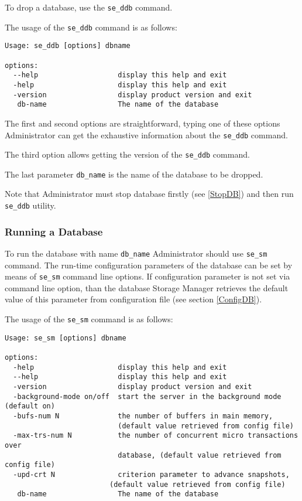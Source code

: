 \documentclass[a4paper,12pt]{article}
\begin{document}
To drop a database, use the \verb!se_ddb! command.

The usage of the \verb!se_ddb! command is as follows:

\begin{verbatim}
Usage: se_ddb [options] dbname

options:
  --help                   display this help and exit
  -help                    display this help and exit
  -version                 display product version and exit
   db-name                 The name of the database
\end{verbatim}

The first and second options are straightforward, typing one of these options Administrator can get the exhaustive information about the \verb!se_ddb! command.

The third option allows getting the version of the \verb!se_ddb! command.

The last parameter \verb!db_name! is the name of the database to be dropped.

Note that Administrator must stop database firstly (see \ref{StopDB}) and then run \verb!se_ddb! utility. 

\subsubsection{Running a Database}
\label{RunDB}

To run the database with name \verb!db_name! Administrator should use \verb!se_sm! command. The run-time configuration parameters of the database can be set by means of \verb!se_sm! command line options. If configuration parameter is not set via command line option, than the database Storage Manager retrieves the default value of this parameter from configuration file (see section \ref{ConfigDB}).

The usage of the \verb!se_sm! command is as follows:

\begin{verbatim}
Usage: se_sm [options] dbname

options:
  -help                    display this help and exit
  --help                   display this help and exit
  -version                 display product version and exit
  -background-mode on/off  start the server in the background mode (default on)
  -bufs-num N              the number of buffers in main memory,
                           (default value retrieved from config file)
  -max-trs-num N           the number of concurrent micro transactions over
                           database, (default value retrieved from config file)
  -upd-crt N               criterion parameter to advance snapshots,
                         (default value retrieved from config file)
   db-name                 The name of the database
\end{verbatim}
\end{document}
